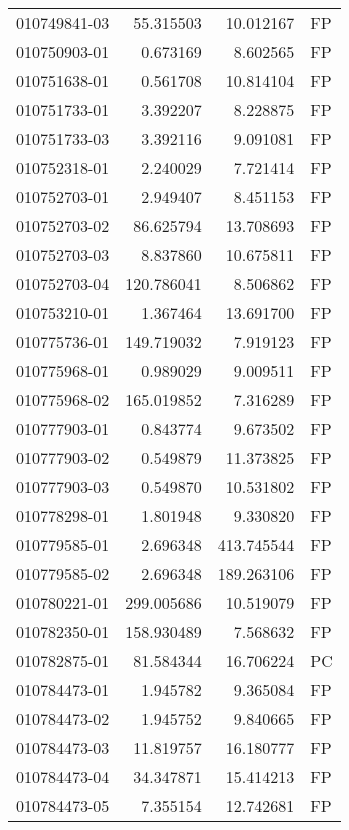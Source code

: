 \begin{tabular}{lrrl}
010749841-03 &   55.315503 &      10.012167 &   FP \\
010750903-01 &    0.673169 &       8.602565 &   FP \\
010751638-01 &    0.561708 &      10.814104 &   FP \\
010751733-01 &    3.392207 &       8.228875 &   FP \\
010751733-03 &    3.392116 &       9.091081 &   FP \\
010752318-01 &    2.240029 &       7.721414 &   FP \\
010752703-01 &    2.949407 &       8.451153 &   FP \\
010752703-02 &   86.625794 &      13.708693 &   FP \\
010752703-03 &    8.837860 &      10.675811 &   FP \\
010752703-04 &  120.786041 &       8.506862 &   FP \\
010753210-01 &    1.367464 &      13.691700 &   FP \\
010775736-01 &  149.719032 &       7.919123 &   FP \\
010775968-01 &    0.989029 &       9.009511 &   FP \\
010775968-02 &  165.019852 &       7.316289 &   FP \\
010777903-01 &    0.843774 &       9.673502 &   FP \\
010777903-02 &    0.549879 &      11.373825 &   FP \\
010777903-03 &    0.549870 &      10.531802 &   FP \\
010778298-01 &    1.801948 &       9.330820 &   FP \\
010779585-01 &    2.696348 &     413.745544 &   FP \\
010779585-02 &    2.696348 &     189.263106 &   FP \\
010780221-01 &  299.005686 &      10.519079 &   FP \\
010782350-01 &  158.930489 &       7.568632 &   FP \\
010782875-01 &   81.584344 &      16.706224 &   PC \\
010784473-01 &    1.945782 &       9.365084 &   FP \\
010784473-02 &    1.945752 &       9.840665 &   FP \\
010784473-03 &   11.819757 &      16.180777 &   FP \\
010784473-04 &   34.347871 &      15.414213 &   FP \\
010784473-05 &    7.355154 &      12.742681 &   FP \\

\end{tabular}
